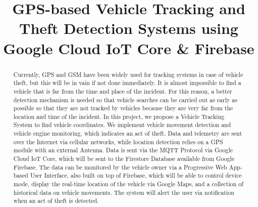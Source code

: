 \documentclass[conference]{IEEEtran}
\begin{document}
\title{GPS-based Vehicle Tracking and Theft Detection Systems using Google Cloud IoT Core \& Firebase}

\author{
}


\maketitle

\begin{abstract}
Currently, GPS and GSM have been widely used for tracking systems in case of vehicle theft, but this will be in vain if not done immediately. It is almost impossible to find a vehicle that is far from the time and place of the incident. For this reason, a better detection mechanism is needed so that vehicle searches can be carried out as early as possible so that they are not tracked by vehicles because they are very far from the location and time of the incident. In this project, we propose a Vehicle Tracking System to find vehicle coordinates. We implement vehicle movement detection and vehicle engine monitoring, which indicates an act of theft. Data and telemetry are sent over the Internet via cellular networks, while location detection relies on a GPS module with an external Antenna. Data is sent via the MQTT Protocol via Google Cloud IoT Core, which will be sent to the Firestore Database available from Google Firebase. The data can be monitored by the vehicle owner via a Progressive Web App-based User Interface, also built on top of Firebase, which will be able to control device mode, display the real-time location of the vehicle via Google Maps, and a collection of historical data on vehicle movements. The system will alert the user via notification when an act of theft is detected.
\end{abstract}
\end{document}

